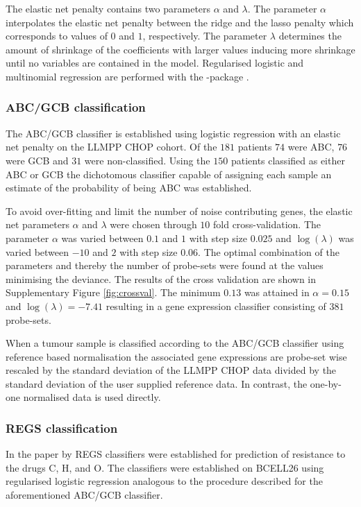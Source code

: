 \documentclass{article}
\begin{document}
The elastic net penalty contains two parameters $\alpha$ and $\lambda$.
The parameter $\alpha$ interpolates the elastic net penalty between the ridge and the lasso penalty which corresponds to values of $0$ and $1$, respectively.
The parameter $\lambda$ determines the amount of shrinkage of the coefficients with larger values inducing more shrinkage until no variables are contained in the model.
Regularised logistic and multinomial regression are performed with the \R{}-package  \citep{Friedman2010}.

\subsubsection{ABC/GCB classification}
The ABC/GCB classifier is established using logistic regression with an elastic net penalty on the LLMPP CHOP cohort.
Of the $181$ patients $74$ were ABC, $76$ were GCB and $31$ were non-classified.
Using the $150$ patients classified as either ABC or GCB the dichotomous classifier capable of assigning each sample an estimate of the probability of being ABC was established.

To avoid over-fitting and limit the number of noise contributing genes, the elastic net parameters $\alpha$ and $\lambda$ were chosen through $10$ fold cross-validation.
The parameter $\alpha$ was varied between $0.1$ and $1$ with step size $0.025$ and $\log(\lambda)$ was varied between $-10$ and $2$ with step size $0.06$.
The optimal combination of the parameters and thereby the number of probe-sets were found at the values minimising the deviance.
The results of the cross validation are shown in Supplementary Figure \ref{fig:crossval}.
The minimum $0.13$ was attained in $\alpha = 0.15$ and $\log(\lambda) = -7.41$ resulting in a gene expression classifier consisting of $381$ probe-sets.

When a tumour sample is classified according to the ABC/GCB classifier using reference based normalisation the associated gene expressions are probe-set wise rescaled by the standard deviation of the LLMPP CHOP data divided by the standard deviation of the user supplied reference data.
In contrast, the one-by-one normalised data is used directly.

\subsubsection{REGS classification}
In the paper by \citet{Falgreen2015} REGS classifiers were established for prediction of resistance to the drugs C, H, and O.
The classifiers were established on BCELL26 using regularised logistic regression analogous to the procedure described for the aforementioned ABC/GCB classifier.
\end{document}
